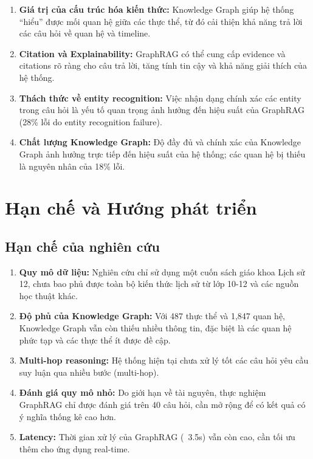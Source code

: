 \begin{enumerate}
    \item \textbf{Giá trị của cấu trúc hóa kiến thức:} Knowledge Graph giúp hệ thống ``hiểu'' được mối quan hệ giữa các thực thể, từ đó cải thiện khả năng trả lời các câu hỏi về quan hệ và timeline.
    
    \item \textbf{Citation và Explainability:} GraphRAG có thể cung cấp evidence và citations rõ ràng cho câu trả lời, tăng tính tin cậy và khả năng giải thích của hệ thống.
    
    \item \textbf{Thách thức về entity recognition:} Việc nhận dạng chính xác các entity trong câu hỏi là yếu tố quan trọng ảnh hưởng đến hiệu suất của GraphRAG (28\% lỗi do entity recognition failure).
    
    \item \textbf{Chất lượng Knowledge Graph:} Độ đầy đủ và chính xác của Knowledge Graph ảnh hưởng trực tiếp đến hiệu suất của hệ thống; các quan hệ bị thiếu là nguyên nhân của 18\% lỗi.
\end{enumerate}

\section{Hạn chế và Hướng phát triển}

\subsection{Hạn chế của nghiên cứu}

\begin{enumerate}
    \item \textbf{Quy mô dữ liệu:} Nghiên cứu chỉ sử dụng một cuốn sách giáo khoa Lịch sử 12, chưa bao phủ được toàn bộ kiến thức lịch sử từ lớp 10-12 và các nguồn học thuật khác.
    
    \item \textbf{Độ phủ của Knowledge Graph:} Với 487 thực thể và 1,847 quan hệ, Knowledge Graph vẫn còn thiếu nhiều thông tin, đặc biệt là các quan hệ phức tạp và các thực thể ít được đề cập.
    
    \item \textbf{Multi-hop reasoning:} Hệ thống hiện tại chưa xử lý tốt các câu hỏi yêu cầu suy luận qua nhiều bước (multi-hop).
    
    \item \textbf{Đánh giá quy mô nhỏ:} Do giới hạn về tài nguyên, thực nghiệm GraphRAG chỉ được đánh giá trên 40 câu hỏi, cần mở rộng để có kết quả có ý nghĩa thống kê cao hơn.
    
    \item \textbf{Latency:} Thời gian xử lý của GraphRAG (~3.5s) vẫn còn cao, cần tối ưu thêm cho ứng dụng real-time.
\end{enumerate}

